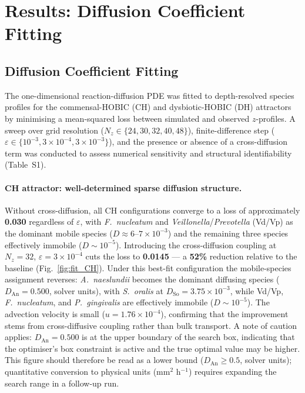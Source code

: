 \section*{Results: Diffusion Coefficient Fitting}
\subsection{Diffusion Coefficient Fitting}
\label{subsec:diffusion_fit}

The one-dimensional reaction-diffusion PDE was fitted to depth-resolved species
profiles for the commensal-HOBIC (CH) and dysbiotic-HOBIC (DH) attractors by
minimising a mean-squared loss between simulated and observed $z$-profiles.
A sweep over grid resolution ($N_z \in \{24, 30, 32, 40, 48\}$), finite-difference
step ($\varepsilon \in \{10^{-3}, 3\times10^{-4}, 3\times10^{-3}\}$), and the
presence or absence of a cross-diffusion term was conducted to assess numerical
sensitivity and structural identifiability (Table~S1).

\paragraph{CH attractor: well-determined sparse diffusion structure.}
Without cross-diffusion, all CH configurations converge to a loss of approximately
\textbf{0.030} regardless of $\varepsilon$, with \textit{F.~nucleatum} and
\textit{Veillonella}/\textit{Prevotella} (Vd/Vp) as the dominant mobile species
($D \approx 6$--$7\times10^{-3}$) and the remaining three species effectively
immobile ($D \sim 10^{-5}$).
Introducing the cross-diffusion coupling at $N_z = 32$, $\varepsilon = 3\times10^{-4}$
cuts the loss to \textbf{0.0145} — a \textbf{52\%} reduction relative to the
baseline (Fig.~\ref{fig:fit_CH}).
Under this best-fit configuration the mobile-species assignment reverses:
\textit{A.~naeslundii} becomes the dominant diffusing species
($D_{\mathrm{An}} = \mathbf{0.500}$, solver units), with \textit{S.~oralis}
at $D_{\mathrm{So}} = 3.75\times10^{-3}$, while Vd/Vp, \textit{F.~nucleatum},
and \textit{P.~gingivalis} are effectively immobile ($D \sim 10^{-5}$).
The advection velocity is small ($u = 1.76\times10^{-4}$), confirming that the
improvement stems from cross-diffusive coupling rather than bulk transport.
A note of caution applies: $D_{\mathrm{An}} = 0.500$ is at the upper boundary of
the search box, indicating that the optimiser's box constraint is active and the
true optimal value may be higher.
This figure should therefore be read as a lower bound ($D_{\mathrm{An}} \geq 0.5$,
solver units); quantitative conversion to physical units (mm$^2$ h$^{-1}$)
requires expanding the search range in a follow-up run.

